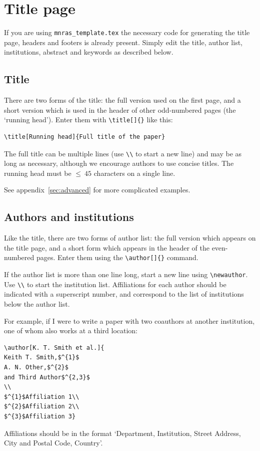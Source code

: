 \documentclass[a4paper,fleqn,usenatbib,useAMS]{mnras}
\begin{document}
\section{Title page}

If you are using \texttt{mnras\_template.tex} the necessary code for generating the title page, headers and footers is already present.
Simply edit the title, author list, institutions, abstract and keywords as described below.

\subsection{Title}
There are two forms of the title: the full version used on the first page, and a short version which is used in the header of other odd-numbered pages (the `running head').
Enter them with \verb'\title[]{}' like this:
\begin{verbatim}
\title[Running head]{Full title of the paper}
\end{verbatim}
The full title can be multiple lines (use \verb'\\' to start a new line) and may be as long as necessary, although we encourage authors to use concise titles. The running head must be $\le~45$ characters on a single line.

See appendix~\ref{sec:advanced} for more complicated examples.

\subsection{Authors and institutions}

Like the title, there are two forms of author list: the full version which appears on the title page, and a short form which appears in the header of the even-numbered pages. Enter them using the \verb'\author[]{}' command.

If the author list is more than one line long, start a new line using \verb'\newauthor'. Use \verb'\\' to start the institution list. Affiliations for each author should be indicated with a superscript number, and correspond to the list of institutions below the author list.

For example, if I were to write a paper with two coauthors at another institution, one of whom also works at a third location:
\begin{verbatim}
\author[K. T. Smith et al.]{
Keith T. Smith,$^{1}$
A. N. Other,$^{2}$
and Third Author$^{2,3}$
\\
$^{1}$Affiliation 1\\
$^{2}$Affiliation 2\\
$^{3}$Affiliation 3}
\end{verbatim}
Affiliations should be in the format `Department, Institution, Street Address, City and Postal Code, Country'.
\end{document}
